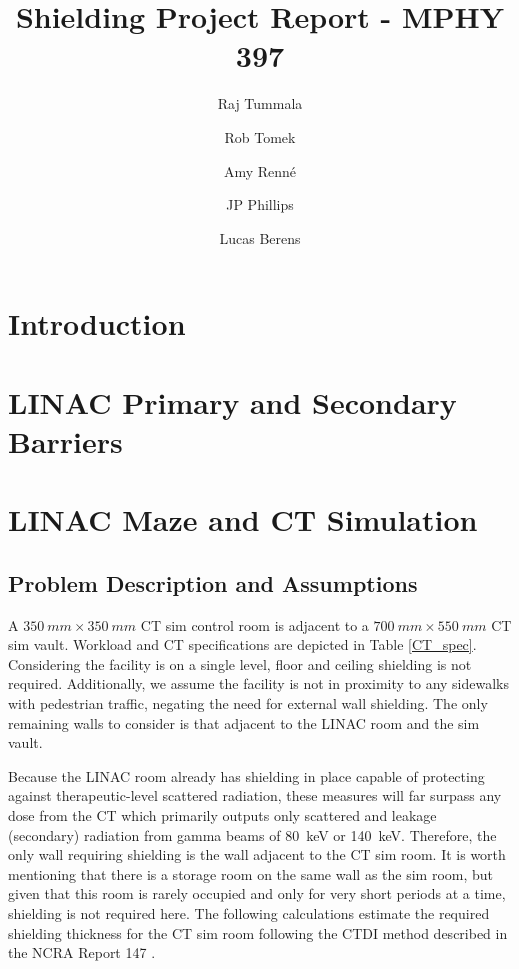\documentclass[%
aps,
mph,%
amsmath,amssymb,
preprint,%
tightenlines,
longbibliography,
superscriptaddress,
floatfix,
nofootinbib,
]{revtex4-2}
\begin{document}
\title{Shielding Project Report - MPHY 397}


\author{Raj Tummala}

\author{Rob Tomek}

\author{Amy Renn\'{e}}

\author{JP Phillips}

\author{Lucas Berens}

\maketitle


\section{Introduction}
\section{LINAC Primary and Secondary Barriers}
\section{LINAC Maze and CT Simulation}
    \subsection{Problem Description and Assumptions}
        A $\SI{350}{mm} \times \SI{350}{mm}$ CT sim control room is adjacent to a $\SI{700}{mm} \times \SI{550}{mm}$ CT sim vault. Workload and CT specifications are depicted in Table \ref{CT_spec}. Considering the facility is on a single level, floor and ceiling shielding is not required. Additionally, we assume the facility is not in proximity to any sidewalks with pedestrian traffic, negating the need for external wall shielding. The only remaining walls to consider is that adjacent to the LINAC room and the sim vault.
        
        Because the LINAC room already has shielding in place capable of protecting against therapeutic-level scattered radiation, these measures will far surpass any dose from the CT which primarily outputs only scattered and leakage (secondary) radiation from gamma beams of \SI{80}{keV} or \SI{140}{keV}. Therefore, the only wall requiring shielding is the wall adjacent to the CT sim room. It is worth mentioning that there is a storage room on the same wall as the sim room, but given that this room is rarely occupied and only for very short periods at a time, shielding is not required here. The following calculations estimate the required shielding thickness for the CT sim room following the CTDI method described in the NCRA Report 147 \cite{national2004ncrp}. 
\end{document}
